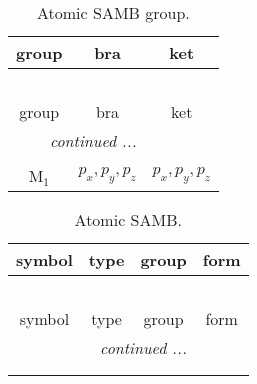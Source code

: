 \documentclass[fleqn,10pt,landscape]{article}
\begin{document}
\begin{itemize}
\begin{dmath*}
\end{dmath*}
\begin{center}
\renewcommand{\arraystretch}{1.3}
\begin{longtable}{c|c|c}
\caption{Atomic SAMB group.}
 \\
 \hline \hline
group & bra & ket \\ \hline \endfirsthead

\multicolumn{2}{l}{\tablename\ \thetable{}} \\
 \hline \hline
group & bra & ket \\ \hline \endhead

 \hline \hline
\multicolumn{2}{r}{\footnotesize\it continued ...} \\ \endfoot

 \hline \hline
\multicolumn{2}{r}{} \\ \endlastfoot

M$_{1}$ & $p_{x}, p_{y}, p_{z}$ & $p_{x}, p_{y}, p_{z}$ \\
\end{longtable}
\end{center}
\begin{center}
\renewcommand{\arraystretch}{1.3}
\begin{longtable}{c|c|c|c}
\caption{Atomic SAMB.}
 \\
 \hline \hline
symbol & type & group & form \\ \hline \endfirsthead

\multicolumn{3}{l}{\tablename\ \thetable{}} \\
 \hline \hline
symbol & type & group & form \\ \hline \endhead

 \hline \hline
\multicolumn{3}{r}{\footnotesize\it continued ...} \\ \endfoot

 \hline \hline
\multicolumn{3}{r}{} \\ \endlastfoot


\end{longtable}
\end{center}
\end{itemize}
\end{document}

